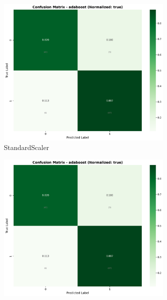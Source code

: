 \begin{figure}[H]\centering
\begin{subfigure}[b]{0.31\textwidth}\centering
\includegraphics[width=0.95\textwidth]{Result/heart_dataset/confusion_matrices/adaboost_numeric_dataset_StandardScaler.png}
\caption{StandardScaler}\label{fig:adaboost_heart_cm_standard}
\end{subfigure}\hfill
\begin{subfigure}[b]{0.31\textwidth}\centering
\includegraphics[width=0.95\textwidth]{Result/heart_dataset/confusion_matrices/adaboost_numeric_dataset_MinMaxScaler.png}

\end{subfigure}
\end{figure}

